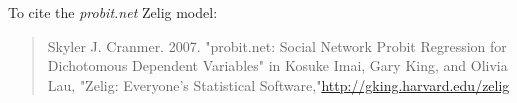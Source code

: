 To cite the \emph{ probit.net } Zelig model:
 \begin{verse}
 Skyler J. Cranmer. 2007. "probit.net: Social Network Probit Regression for Dichotomous Dependent Variables" in Kosuke Imai, Gary King, and Olivia Lau, "Zelig: Everyone's Statistical Software,"\url{http://gking.harvard.edu/zelig} 
\end{verse}